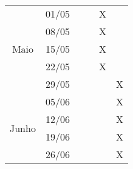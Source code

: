 \begin{table}[h]
\begin{tabular}{|cc|c|c|c|c|}
        \multicolumn{1}{|c|}{\multirow{5}{*}{Maio}}  & 01/05         &             &               & X           &   \\ \cline{2-6}
        \multicolumn{1}{|c|}{}                       & 08/05         &             &               & X           &   \\ \cline{2-6}
        \multicolumn{1}{|c|}{}                       & 15/05         &             &               & X           &   \\ \cline{2-6}
        \multicolumn{1}{|c|}{}                       & 22/05         &             &               & X           &   \\ \cline{2-6}
        \multicolumn{1}{|c|}{}                       & 29/05         &             &               &             & X \\ \hline
        \multicolumn{1}{|c|}{\multirow{4}{*}{Junho}} & 05/06         &             &               &             & X \\ \cline{2-6}
        \multicolumn{1}{|c|}{}                       & 12/06         &             &               &             & X \\ \cline{2-6}
        \multicolumn{1}{|c|}{}                       & 19/06         &             &               &             & X \\ \cline{2-6}
        \multicolumn{1}{|c|}{}                       & 26/06         &             &               &             & X \\ \hline
    \end{tabular}
    \label{tab:tabelacronograma}
\end{table}
